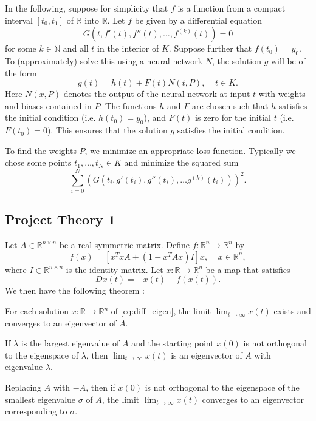 In the following, suppose for simplicity that $f$ is a function from a compact interval $[t_0,t_1]$ of $\mathbb{R}$ into $\mathbb{R}$. Let $f$ be given by a differential equation
\begin{equation*}
    G(t,f'(t),f''(t),\ldots,f^{(k)}(t)) = 0
\end{equation*}
for some $k\in\mathbb{N}$ and all $t$ in the interior of $K$. Suppose further that $f(t_0)=y_0$. To (approximately) solve this using a neural network $N$, the solution $g$ will be of the form
\begin{equation*}
    g(t) = h(t) + F(t)N(t,P),\;\;\;\;t\in K.
\end{equation*}
Here $N(x,P)$ denotes the output of the neural network at input $t$ with weights and biases contained in $P$. The functions $h$ and $F$ are chosen such that $h$ satisfies the initial condition (i.e. $h(t_0)=y_0$), and $F(t)$ is zero for the initial $t$ (i.e. $F(t_0)=0$). This ensures that the solution $g$ satisfies the initial condition.

To find the weights $P$, we minimize an appropriate loss function. Typically we chose some points $t_1,\ldots,t_N\in K$ and minimize the squared sum
\begin{equation*}
    \sum_{i=0}^N(G(t_i,g'(t_i),g''(t_i),\ldots g^{(k)}(t_i)))^2.
\end{equation*}


\subsection{Project Theory 1}\label{sec:project theory}


Let $A\in\mathbb{R}^{n\times n}$ be a real symmetric matrix. Define $f\colon\mathbb{R}^n\to\mathbb{R}^n$ by
\[
f(x)=[x^TxA+(1-x^TAx)I]x,\;\;\;\; x\in\mathbb{R}^n,
\]
where $I\in\mathbb{R}^{n\times n}$ is the identity matrix. Let $x\colon\mathbb{R}\to\mathbb{R}^n$ be a map that satisfies
\begin{equation}\label{eq:diff_eigen}
    Dx(t)=-x(t)+f(x(t)).
\end{equation}
We then have the following theorem \cite{yfh04}:
\begin{theorem}
For each solution $x\colon\mathbb{R}\to\mathbb{R}^n$ of \autoref{eq:diff_eigen}, the limit $\lim_{t\to\infty}x(t)$ exists and converges to an eigenvector of $A$.

If $\lambda$ is the largest eigenvalue of $A$ and the starting point $x(0)$ is not orthogonal to the eigenspace of $\lambda$, then $\lim_{t\to\infty}x(t)$ is an eigenvector of $A$ with eigenvalue $\lambda$.

Replacing $A$ with $-A$, then if $x(0)$ is not orthogonal to the eigenspace of the smallest eigenvalue $\sigma$ of $A$, the limit $\lim_{t\to\infty}x(t)$ converges to an eigenvector corresponding to $\sigma$.
\end{theorem}

